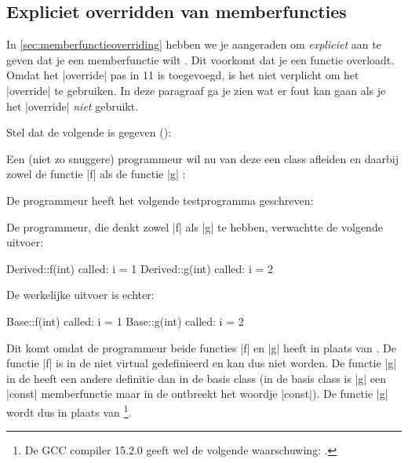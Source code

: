 \begin{cpplstShortInline}
\section{Expliciet overridden van memberfuncties}
\label{sec:explicitoverride}
In \cref{sec:memberfunctieoverriding} hebben we je aangeraden om \emph{expliciet} aan te geven dat je een memberfunctie wilt .
Dit voorkomt dat je een functie  overloadt.
Omdat het  |override| pas in \Cpp{}11 is toegevoegd, is het niet verplicht om het  |override| te gebruiken.
In deze paragraaf ga je zien wat er fout kan gaan als je het  |override| \emph{niet} gebruikt.

Stel dat de volgende  is gegeven ():

Een (niet zo snuggere) programmeur wil nu van deze  een class afleiden en daarbij zowel de
functie |f| als de functie |g| \emph{}:

De programmeur heeft het volgende testprogramma geschreven:

De programmeur, die denkt zowel |f| als |g|  te hebben, verwachtte de volgende uitvoer:
\begin{coutput}
Derived::f(int) called: i = 1
Derived::g(int) called: i = 2
\end{coutput}

De werkelijke uitvoer is echter:
\begin{coutput}
Base::f(int) called: i = 1
Base::g(int) called: i = 2
\end{coutput}

Dit komt omdat de programmeur beide functies |f| en |g| \emph{} heeft in plaats van .
De functie |f| is in de  niet virtual gedefinieerd en kan dus niet  worden.
De functie |g| in de  heeft een andere definitie dan in de basis class (in de basis class is |g| een |const|
memberfunctie maar in de  ontbreekt het woordje |const|).
De functie |g| wordt dus  in plaats van \footnote{%
	De GCC compiler 15.2.0 geeft wel de volgende waarschuwing: .
}.


\end{cpplstShortInline}
